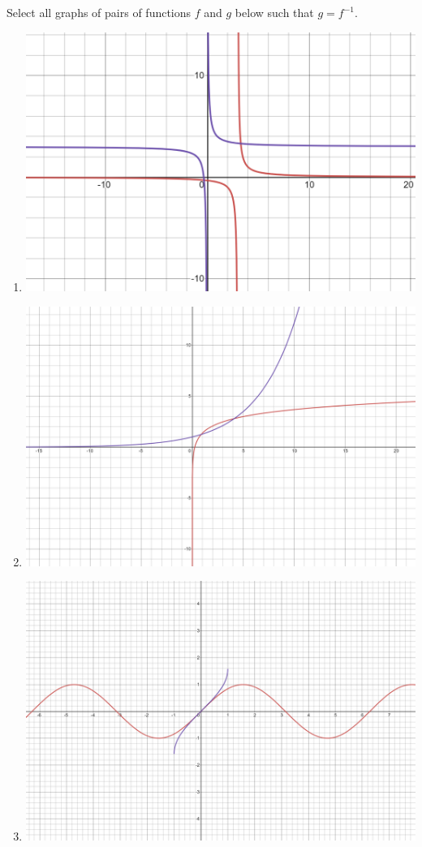 \documentclass{ximera}
\author{Kenneth Berglund}
\begin{document}
\begin{exercise}
Select all graphs of pairs of functions $f$ and $g$ below such that $g = f^{-1}$.

\begin{enumerate}
\item
\begin{image}
\includegraphics[width=.7\textwidth]{IFR7a.png}
\end{image}
\item
\begin{image}
\includegraphics[width=.7\textwidth]{IFR7b.png}
\end{image}
\item
\begin{image}
\includegraphics[width=.7\textwidth]{IFR7c.png}

\end{image}
\end{enumerate}
\end{exercise}
\end{document}
